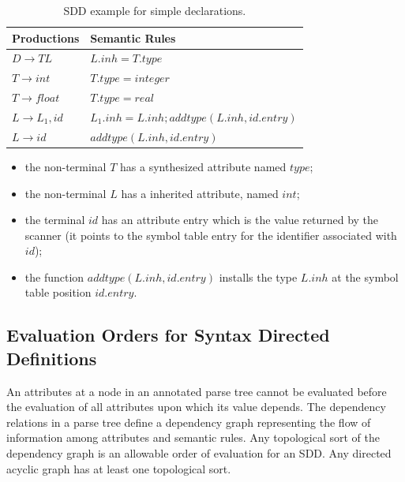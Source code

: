 \begin{table}[h]
    \centering
    \begin{tabular}{l|l}
        Productions & Semantic Rules \\ \hline
        $D \to TL$ & $L.inh = T.type$ \\ \hline
        $T \to int$ & $T.type = integer$ \\ \hline
        $T \to float$ & $T.type = real$ \\ \hline
        $L \to L_1, id$ & $L_1.inh = L.inh; addtype(L.inh, id.entry)$ \\ \hline
        $L \to id$ & $addtype(L.inh, id.entry)$
    \end{tabular}
    \caption{SDD example for simple declarations.}
\end{table}

\begin{itemize}
    \item the non-terminal $T$ has a synthesized attribute named $type$;
    \item the non-terminal $L$ has a inherited attribute, named $int$;
    \item the terminal $id$ has an attribute entry which is the value returned by the scanner (it points to the symbol table entry for the identifier associated with $id$);
    \item the function $addtype(L.inh, id.entry)$ installs the type $L.inh$ at the symbol table position $id.entry$.
\end{itemize}

\subsection{Evaluation Orders for Syntax Directed Definitions}
An attributes at a node in an annotated parse tree cannot be evaluated before the evaluation of all attributes upon which its value depends.
The dependency relations in a parse tree define a dependency graph representing the flow of information among attributes and semantic rules.
Any topological sort of the dependency graph is an allowable order of evaluation for an SDD.
Any directed acyclic graph has at least one topological sort.

